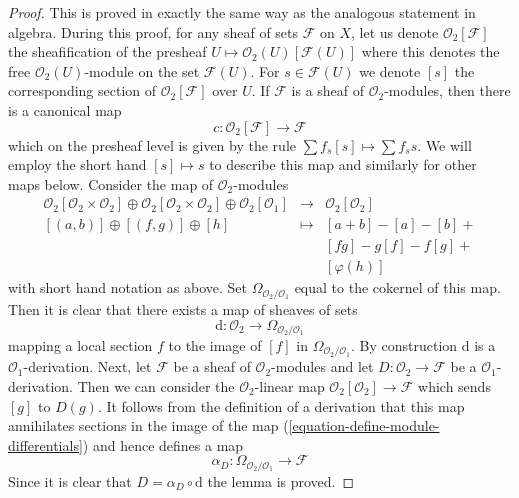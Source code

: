 \documentclass{stacks-project}
\theoremstyle{plain}
\theoremstyle{definition}
\theoremstyle{remark}
\numberwithin{equation}{subsection}
\begin{document}
\begin{proof}
This is proved in exactly the same way as the analogous statement in algebra.
During this proof, for any sheaf of sets $\mathcal{F}$ on $X$,
let us denote $\mathcal{O}_2[\mathcal{F}]$ the sheafification of the
presheaf $U \mapsto \mathcal{O}_2(U)[\mathcal{F}(U)]$ where this denotes
the free $\mathcal{O}_2(U)$-module on the set $\mathcal{F}(U)$.
For $s \in \mathcal{F}(U)$ we denote $[s]$ the corresponding section
of $\mathcal{O}_2[\mathcal{F}]$ over $U$. If $\mathcal{F}$ is a sheaf of
$\mathcal{O}_2$-modules, then there is a canonical map
$$
c : \mathcal{O}_2[\mathcal{F}] \longrightarrow \mathcal{F}
$$
which on the presheaf level is given by the rule
$\sum f_s[s] \mapsto \sum f_s s$. We will employ the short hand
$[s] \mapsto s$ to
describe this map and similarly for other maps below. Consider
the map of $\mathcal{O}_2$-modules
\begin{equation}
\label{equation-define-module-differentials}
\begin{matrix}
\mathcal{O}_2[\mathcal{O}_2 \times \mathcal{O}_2] \oplus
\mathcal{O}_2[\mathcal{O}_2 \times \mathcal{O}_2] \oplus
\mathcal{O}_2[\mathcal{O}_1] &
\longrightarrow &
\mathcal{O}_2[\mathcal{O}_2] \\
[(a, b)] \oplus [(f, g)] \oplus [h] & \longmapsto & [a + b] - [a] - [b] + \\
& & [fg] - g[f] - f[g] + \\
& & [\varphi(h)]
\end{matrix}
\end{equation}
with short hand notation as above. Set $\Omega_{\mathcal{O}_2/\mathcal{O}_1}$
equal to the cokernel of this map. Then it is clear that there exists
a map of sheaves of sets
$$
\text{d} : \mathcal{O}_2 \longrightarrow \Omega_{\mathcal{O}_2/\mathcal{O}_1}
$$
mapping a local section $f$ to the image of $[f]$ in
$\Omega_{\mathcal{O}_2/\mathcal{O}_1}$. By construction $\text{d}$
is a $\mathcal{O}_1$-derivation. Next, let $\mathcal{F}$
be a sheaf of $\mathcal{O}_2$-modules and let
$D : \mathcal{O}_2 \to \mathcal{F}$ be a $\mathcal{O}_1$-derivation.
Then we can consider the $\mathcal{O}_2$-linear map
$\mathcal{O}_2[\mathcal{O}_2] \to \mathcal{F}$ which sends $[g]$ to $D(g)$.
It follows from the definition of a derivation that this map annihilates
sections in the image of the map (\ref{equation-define-module-differentials})
and hence defines a map
$$
\alpha_D : \Omega_{\mathcal{O}_2/\mathcal{O}_1} \longrightarrow \mathcal{F}
$$
Since it is clear that $D = \alpha_D \circ \text{d}$ the lemma is proved.
\end{proof}
\end{document}

